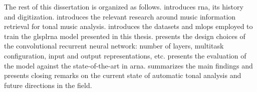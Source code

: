 
The rest of this dissertation is organized as follows.
 introduces
\gls{rna}, its history and digitization.
 introduces the relevant research around
music information retrieval for tonal music analysis.
 introduces the
datasets and \gls{mlops} employed to train the glspl{rna}
model presented in this thesis. 
presents the design choices of the convolutional recurrent
neural network: number of layers, multitask configuration,
input and output representations, etc.
 presents the evaluation of
the model against the state-of-the-art in \gls{arna}.
 summarizes the main findings and
presents closing remarks on the current state of automatic
tonal analysis and future directions in the field.
